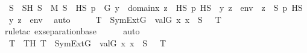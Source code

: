 \begin{isabellebody}
\ S\ \ SH{\isacharcolon}{\kern0pt}\ {\isachardoublequoteopen}S\ {\isasymin}\ M{\isachardoublequoteclose}\ {\isachardoublequoteopen}S\ {\isasymsubseteq}\ HS{\isachardoublequoteclose}\ {\isachardoublequoteopen}{\isacharparenleft}{\kern0pt}{\isasymforall}p\ {\isasymin}\ G{\isachardot}{\kern0pt}\ {\isasymforall}y\ {\isasymin}\ domain{\isacharparenleft}{\kern0pt}x{\isacharprime}{\kern0pt}{\isacharparenright}{\kern0pt}{\isachardot}{\kern0pt}\ {\isacharparenleft}{\kern0pt}{\isasymexists}z\ {\isasymin}\ HS{\isachardot}{\kern0pt}\ p\ {\isasymtturnstile}HS\ {\isasymphi}\ {\isacharparenleft}{\kern0pt}{\isacharbrackleft}{\kern0pt}y{\isacharcomma}{\kern0pt}\ z{\isacharbrackright}{\kern0pt}\ {\isacharat}{\kern0pt}\ env{\isacharprime}{\kern0pt}{\isacharparenright}{\kern0pt}{\isacharparenright}{\kern0pt}\ {\isasymlongleftrightarrow}\ {\isacharparenleft}{\kern0pt}{\isasymexists}z\ {\isasymin}\ S{\isachardot}{\kern0pt}\ p\ {\isasymtturnstile}HS\ {\isasymphi}\ {\isacharparenleft}{\kern0pt}{\isacharbrackleft}{\kern0pt}y{\isacharcomma}{\kern0pt}\ z{\isacharbrackright}{\kern0pt}\ {\isacharat}{\kern0pt}\ env{\isacharprime}{\kern0pt}{\isacharparenright}{\kern0pt}{\isacharparenright}{\kern0pt}{\isacharparenright}{\kern0pt}{\isachardoublequoteclose}\ \isamarkupfalse%
\ auto\isanewline
\ \ \isamarkupfalse%
\ \isamarkupfalse%
\ {\isachardoublequoteopen}{\isasymexists}T\ {\isasymin}\ SymExt{\isacharparenleft}{\kern0pt}G{\isacharparenright}{\kern0pt}{\isachardot}{\kern0pt}\ {\isacharbraceleft}{\kern0pt}\ val{\isacharparenleft}{\kern0pt}G{\isacharcomma}{\kern0pt}\ x{\isacharparenright}{\kern0pt}{\isachardot}{\kern0pt}\ x\ {\isasymin}\ S\ {\isacharbraceright}{\kern0pt}\ {\isasymsubseteq}\ T{\isachardoublequoteclose}\ \isanewline
\ \ \ \ \isamarkupfalse%
{\isacharparenleft}{\kern0pt}rule{\isacharunderscore}{\kern0pt}tac\ ex{\isacharunderscore}{\kern0pt}separation{\isacharunderscore}{\kern0pt}base{\isacharparenright}{\kern0pt}\isanewline
\ \ \ \ \isamarkupfalse%
\ auto\isanewline
\ \ \isamarkupfalse%
\ \isamarkupfalse%
\ T\ \ TH{\isacharcolon}{\kern0pt}\ {\isachardoublequoteopen}T\ {\isasymin}\ SymExt{\isacharparenleft}{\kern0pt}G{\isacharparenright}{\kern0pt}{\isachardoublequoteclose}\ {\isachardoublequoteopen}{\isacharbraceleft}{\kern0pt}\ val{\isacharparenleft}{\kern0pt}G{\isacharcomma}{\kern0pt}\ x{\isacharparenright}{\kern0pt}{\isachardot}{\kern0pt}\ x\ {\isasymin}\ S\ {\isacharbraceright}{\kern0pt}\ {\isasymsubseteq}\ T{\isachardoublequoteclose}\ \isamarkupfalse%

\end{isabellebody}
